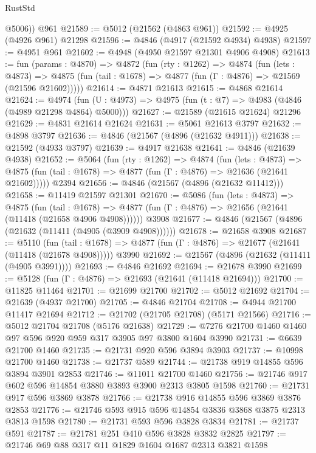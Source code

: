 \begin{lexlean}{RustStd}
\begin{coremodule}
        @5006))
    @961
@21589 := @5012 (@21562 (@4863 @961))
@21592 := @4925 (@4926 @961) @21298
@21596 := @4846 (@4917 (@21592 @4934) @4938)
@21597 := @4951 @961
@21602 := @4948 (@4950 @21597 @21301 @4906 @4908)
@21613 := fun (params : @4870) =>
  @4872
    (fun (rty : @1262) =>
    @4874
      (fun (lets : @4873) =>
      @4875 (fun (tail : @1678) => @4877 (fun (Γ : @4876) => @21569 (@21596 @21602)))))
@21614 := @4871 @21613
@21615 := @4868 @21614
@21624 := @4974
    (fun (U : @4973) => @4975 (fun (t : @7) => @4983 (@4846 (@4989 @21298 @4864) @5000)))
@21627 := @21589 (@21615 @21624) @21296
@21629 := @4831 @21614 @21624
@21631 := @5061 @21613 @3797
@21632 := @4898 @3797
@21636 := @4846 (@21567 (@4896 (@21632 @4911)))
@21638 := @21592 (@4933 @3797)
@21639 := @4917 @21638
@21641 := @4846 (@21639 @4938)
@21652 := @5064
    (fun (rty : @1262) =>
    @4874
      (fun (lets : @4873) =>
      @4875 (fun (tail : @1678) => @4877 (fun (Γ : @4876) => @21636 (@21641 @21602)))))
    @2394
@21656 := @4846 (@21567 (@4896 (@21632 @11412)))
@21658 := @11419 @21597 @21301
@21670 := @5086
    (fun (lets : @4873) =>
    @4875
      (fun (tail : @1678) =>
      @4877 (fun (Γ : @4876) => @21656 (@21641 (@11418 (@21658 @4906 @4908))))))
    @3908
@21677 := @4846 (@21567 (@4896 (@21632 (@11411 (@4905 (@3909 @4908))))))
@21678 := @21658 @3908
@21687 := @5110
    (fun (tail : @1678) => @4877 (fun (Γ : @4876) => @21677 (@21641 (@11418 (@21678 @4908)))))
    @3990
@21692 := @21567 (@4896 (@21632 (@11411 (@4905 @3991))))
@21693 := @4846 @21692
@21694 := @21678 @3990
@21699 := @5128 (fun (Γ : @4876) => @21693 (@21641 (@11418 @21694)))
@21700 := @11825 @11464
@21701 := @21699 @21700
@21702 := @5012 @21692
@21704 := @21639 (@4937 @21700)
@21705 := @4846 @21704
@21708 := @4944 @21700 @11417 @21694
@21712 := @21702 (@21705 @21708) (@5171 @21566)
@21716 := @5012 @21704 @21708 (@5176 @21638)
@21729 := @7276 @21700 @1460 @1460 @97 @596 @920 @959 @317 @3905 @97 @3800 @1604 @3990
@21731 := @6639 @21700 @1460
@21735 := @21731 @920 @596 @3894 @3903
@21737 := @10998 @21700 @1460
@21738 := @21737 @589
@21744 := @21738 @919 @14855 @596 @3894 @3901 @2853
@21746 := @11011 @21700 @1460
@21756 := @21746 @917 @602 @596 @14854 @3880 @3893 @3900 @2313 @3805 @1598
@21760 := @21731 @917 @596 @3869 @3878
@21766 := @21738 @916 @14855 @596 @3869 @3876 @2853
@21776 := @21746 @593 @915 @596 @14854 @3836 @3868 @3875 @2313 @3813 @1598
@21780 := @21731 @593 @596 @3828 @3834
@21781 := @21737 @591
@21787 := @21781 @251 @410 @596 @3828 @3832 @2825
@21797 := @21746 @69 @88 @317 @11 @1829 @1604 @1687 @2313 @3821 @1598

\end{coremodule}
\end{lexlean}

